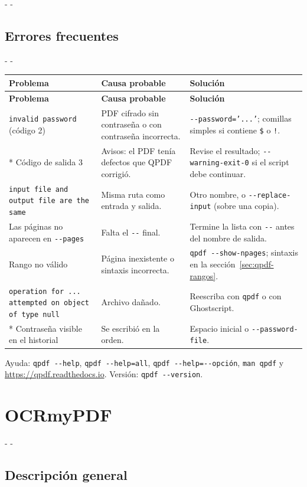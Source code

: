 \documentclass[11pt,a4paper]{article}
\makeatletter
\newcommand{\necesitaespacio}[1]{\par\penalty-100\begingroup
	\setlength{\dimen@}{#1}\dimen@ii\pagegoal\advance\dimen@ii-\pagetotal
	\ifdim\dimen@>\dimen@ii\ifdim\dimen@ii>\z@\vfil\fi\penalty-\@M\fi\endgroup}
\newenvironment{errores}{%
	\par\begingroup\small
	\begin{longtable}{L{4.1cm}L{4.9cm}L{6.0cm}}
		\toprule\rowcolor{tablacab}\cab{Problema} & \cab{Causa probable} & \cab{Solución} \\ \midrule
		\endfirsthead
		\toprule\rowcolor{tablacab}\cab{Problema} & \cab{Causa probable} & \cab{Solución} \\ \midrule
		\endhead
		\bottomrule
		\endfoot}
	{\end{longtable}\endgroup}
\newcommand{\cmd}[1]{\texttt{\textcolor{colcmd}{#1}}}      %
\newcommand{\opt}[1]{\texttt{\textcolor{colopt}{#1}}}      %
\newcommand{\cab}[1]{\textbf{#1}}
\makeatother
\begin{document}
	\necesitaespacio{30\baselineskip}
	\subsection{Errores frecuentes}
	
	\necesitaespacio{26\baselineskip}
	\begin{errores}
		\texttt{invalid password} (código 2) & PDF cifrado sin contraseña o con contraseña incorrecta. & \opt{-{}-password=\allowbreak{}'...'}; comillas simples si contiene \texttt{\$} o \texttt{!}.\\*
		Código de salida 3 & Avisos: el PDF tenía defectos que QPDF corrigió. & Revise el resultado; \opt{-{}-warning-\allowbreak{}exit-\allowbreak{}0} si el script debe continuar.\\
		\texttt{input file and output file are the same} & Misma ruta como entrada y salida. & Otro nombre, o \opt{-{}-replace-\allowbreak{}input} (sobre una copia).\\
		Las páginas no aparecen en \opt{-{}-pages} & Falta el \opt{-{}-} final. & Termine la lista con \opt{-{}-} antes del nombre de salida.\\
		Rango no válido & Página inexistente o sintaxis incorrecta. & \cmd{qpdf -{}-show-\allowbreak{}npages}; sintaxis en la sección~\ref{sec:qpdf-rangos}.\\
		\texttt{operation for ... attempted on object of type null} & Archivo dañado. & Reescriba con \cmd{qpdf} o con Ghostscript.\\*
		Contraseña visible en el historial & Se escribió en la orden. & Espacio inicial o \opt{-{}-password-\allowbreak{}file}.\\
	\end{errores}
	
	Ayuda: \cmd{qpdf -{}-help}, \cmd{qpdf -{}-help=all}, \cmd{qpdf -{}-help=-{}-opción}, \cmd{man qpdf} y \url{https://qpdf.readthedocs.io}. Versión: \cmd{qpdf -{}-version}.
	
	\clearpage
	\section{OCRmyPDF}\label{sec:ocrmypdf}
	
	\necesitaespacio{8\baselineskip}
	\subsection{Descripción general}
	
\end{document}
